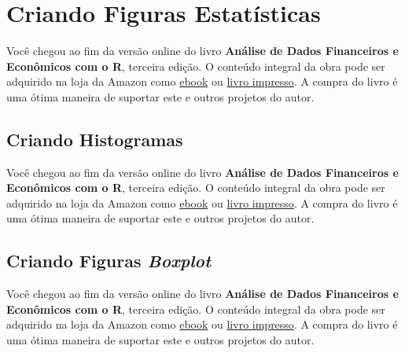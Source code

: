 \documentclass[
  11pt,
]{book}
\newenvironment{pleasebuyit}
{\begin{noteblock}
		
	} {\end{noteblock}}
\begin{document}
\hypertarget{criando-figuras-estatuxedsticas}{%
\section{Criando Figuras Estatísticas}\label{criando-figuras-estatuxedsticas}}

\begin{pleasebuyit}
Você chegou ao fim da versão online do livro \textbf{Análise de Dados
Financeiros e Econômicos com o R}, terceira edição. O conteúdo integral
da obra pode ser adquirido na loja da Amazon como
\href{https://www.amazon.com.br/dp/B08WNC27ZY}{ebook} ou
\href{https://www.amazon.com/dp/B08WP8CCDB}{livro impresso}. A compra do
livro é uma ótima maneira de suportar este e outros projetos do autor.
\end{pleasebuyit}

\hypertarget{criando-histogramas}{%
\subsection{Criando Histogramas}\label{criando-histogramas}}

\begin{pleasebuyit}
Você chegou ao fim da versão online do livro \textbf{Análise de Dados
Financeiros e Econômicos com o R}, terceira edição. O conteúdo integral
da obra pode ser adquirido na loja da Amazon como
\href{https://www.amazon.com.br/dp/B08WNC27ZY}{ebook} ou
\href{https://www.amazon.com/dp/B08WP8CCDB}{livro impresso}. A compra do
livro é uma ótima maneira de suportar este e outros projetos do autor.
\end{pleasebuyit}

\hypertarget{criando-figuras-boxplot}{%
\subsection{\texorpdfstring{Criando Figuras \emph{Boxplot}}{Criando Figuras Boxplot}}\label{criando-figuras-boxplot}}

\begin{pleasebuyit}
Você chegou ao fim da versão online do livro \textbf{Análise de Dados
Financeiros e Econômicos com o R}, terceira edição. O conteúdo integral
da obra pode ser adquirido na loja da Amazon como
\href{https://www.amazon.com.br/dp/B08WNC27ZY}{ebook} ou
\href{https://www.amazon.com/dp/B08WP8CCDB}{livro impresso}. A compra do
livro é uma ótima maneira de suportar este e outros projetos do autor.
\end{pleasebuyit}
\end{document}
